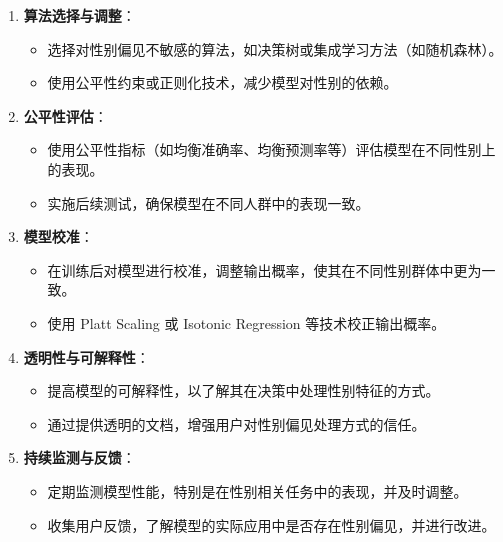 \documentclass[12pt]{article}
\numberwithin{theorem}{section} %
\numberwithin{definition}{section} %
\numberwithin{assumption}{section} %
\numberwithin{lemma}{section} %
\numberwithin{remark}{section} %
\numberwithin{prop}{section} %
\numberwithin{corollary}{section} %
\numberwithin{example}{section} %
\numberwithin{question}{section} %
\numberwithin{problem}{section} %
\numberwithin{conjecture}{section} %
\numberwithin{append}{section} %
\numberwithin{property}{section} %
\begin{document}
\begin{CJK}{UTF8}{gbsn}
\begin{itemize}
\begin{enumerate}
			\item \textbf{算法选择与调整}：
			\begin{itemize}
				\item 选择对性别偏见不敏感的算法，如决策树或集成学习方法（如随机森林）。
				\item 使用公平性约束或正则化技术，减少模型对性别的依赖。
			\end{itemize}
			
			\item \textbf{公平性评估}：
			\begin{itemize}
				\item 使用公平性指标（如均衡准确率、均衡预测率等）评估模型在不同性别上的表现。
				\item 实施后续测试，确保模型在不同人群中的表现一致。
			\end{itemize}
			
			\item \textbf{模型校准}：
			\begin{itemize}
				\item 在训练后对模型进行校准，调整输出概率，使其在不同性别群体中更为一致。
				\item 使用 Platt Scaling 或 Isotonic Regression 等技术校正输出概率。
			\end{itemize}
			
			\item \textbf{透明性与可解释性}：
			\begin{itemize}
				\item 提高模型的可解释性，以了解其在决策中处理性别特征的方式。
				\item 通过提供透明的文档，增强用户对性别偏见处理方式的信任。
			\end{itemize}
			
			\item \textbf{持续监测与反馈}：
			\begin{itemize}
				\item 定期监测模型性能，特别是在性别相关任务中的表现，并及时调整。
				\item 收集用户反馈，了解模型的实际应用中是否存在性别偏见，并进行改进。
			\end{itemize}
		\end{enumerate}
		
	\end{itemize}

\end{CJK}
\end{document}
